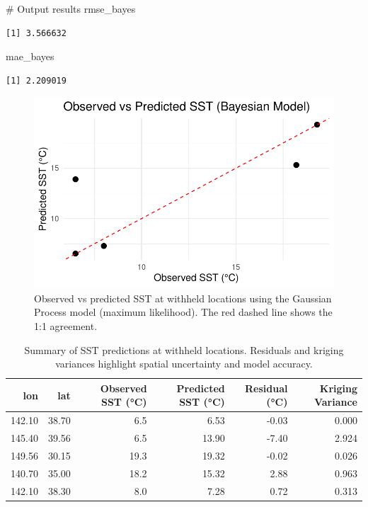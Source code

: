 \documentclass[
  11pt,
]{article}
\newenvironment{Shaded}{\begin{snugshade}}{\end{snugshade}}
\newcommand{\CommentTok}[1]{\textcolor[rgb]{0.37,0.37,0.37}{#1}}
\newcommand{\NormalTok}[1]{\textcolor[rgb]{0.00,0.23,0.31}{#1}}
\begin{document}
\begin{Shaded}
\begin{Highlighting}[]
\CommentTok{\# Output results}
\NormalTok{rmse\_bayes}
\end{Highlighting}
\end{Shaded}

\begin{verbatim}
[1] 3.566632
\end{verbatim}

\begin{Shaded}
\begin{Highlighting}[]
\NormalTok{mae\_bayes}
\end{Highlighting}
\end{Shaded}

\begin{verbatim}
[1] 2.209019
\end{verbatim}

\begin{figure}[H]

{\centering \includegraphics{project_files/figure-pdf/fig-bayes_pred_scatter-1.pdf}

}

\caption{Observed vs predicted SST at withheld locations using the
Gaussian Process model (maximum likelihood). The red dashed line shows
the 1:1 agreement.}

\end{figure}%

\begin{table}

\caption{Summary of SST predictions at withheld locations. Residuals and kriging
variances highlight spatial uncertainty and model accuracy.}
\centering
\begin{tabular}[t]{rrrrrr}
\toprule
lon & lat & Observed SST (°C) & Predicted SST (°C) & Residual (°C) & Kriging Variance\\
\midrule
142.10 & 38.70 & 6.5 & 6.53 & -0.03 & 0.000\\
145.40 & 39.56 & 6.5 & 13.90 & -7.40 & 2.924\\
149.56 & 30.15 & 19.3 & 19.32 & -0.02 & 0.026\\
140.70 & 35.00 & 18.2 & 15.32 & 2.88 & 0.963\\
142.10 & 38.30 & 8.0 & 7.28 & 0.72 & 0.313\\
\bottomrule
\end{tabular}
\end{table}
\end{document}
